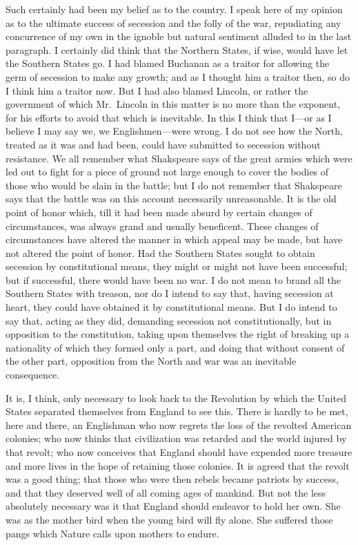 Such certainly had been my belief as to the country.  I speak here
of my opinion as to the ultimate success of secession and the folly
of the war, repudiating any concurrence of my own in the ignoble
but natural sentiment alluded to in the last paragraph.  I
certainly did think that the Northern States, if wise, would have
let the Southern States go.  I had blamed Buchanan as a traitor for
allowing the germ of secession to make any growth; and as I thought
him a traitor then, so do I think him a traitor now.  But I had
also blamed Lincoln, or rather the government of which Mr.\ Lincoln
in this matter is no more than the exponent, for his efforts to
avoid that which is inevitable.  In this I think that I---or as I
believe I may say we, we Englishmen---were wrong.  I do not see how
the North, treated as it was and had been, could have submitted to
secession without resistance.  We all remember what Shakspeare says
of the great armies which were led out to fight for a piece of
ground not large enough to cover the bodies of those who would be
slain in the battle; but I do not remember that Shakspeare says
that the battle was on this account necessarily unreasonable.  It
is the old point of honor which, till it had been made absurd by
certain changes of circumstances, was always grand and usually
beneficent.  These changes of circumstances have altered the manner
in which appeal may be made, but have not altered the point of
honor.  Had the Southern States sought to obtain secession by
constitutional means, they might or might not have been successful;
but if successful, there would have been no war.  I do not mean to
brand all the Southern States with treason, nor do I intend to say
that, having secession at heart, they could have obtained it by
constitutional means.  But I do intend to say that, acting as they
did, demanding secession not constitutionally, but in opposition to
the constitution, taking upon themselves the right of breaking up a
nationality of which they formed only a part, and doing that
without consent of the other part, opposition from the North and
war was an inevitable consequence.

It is, I think, only necessary to look back to the Revolution by
which the United States separated themselves from England to see
this.  There is hardly to be met, here and there, an Englishman who
now regrets the loss of the revolted American colonies; who now
thinks that civilization was retarded and the world injured by that
revolt; who now conceives that England should have expended more
treasure and more lives in the hope of retaining those colonies.
It is agreed that the revolt was a good thing; that those who were
then rebels became patriots by success, and that they deserved well
of all coming ages of mankind.  But not the less absolutely
necessary was it that England should endeavor to hold her own.  She
was as the mother bird when the young bird will fly alone.  She
suffered those pangs which Nature calls upon mothers to endure.

